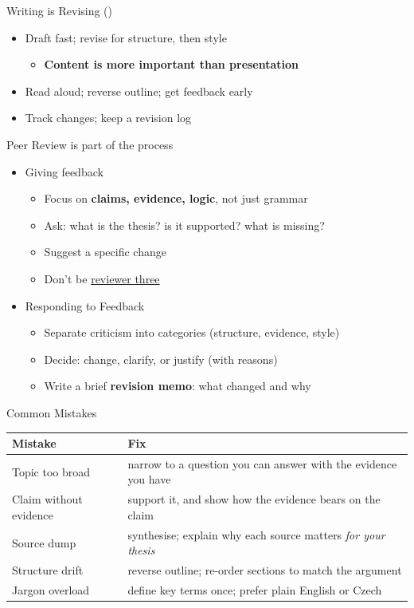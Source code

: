 \documentclass[aspectratio=169]{beamer}
\begin{document}
\begin{frame}{Writing is Revising (\dateWorkshop)}
\begin{itemize}
\item Draft fast; revise for structure, then style
  \begin{itemize}
  \item \textbf{Content is more important than presentation}
  \end{itemize}
  \item Read aloud; reverse outline; get feedback early
  \item Track changes; keep a revision log
\end{itemize}
\end{frame}

\begin{frame}{Peer Review is part of the process}
  \begin{itemize}
  \item Giving feedback
    \begin{itemize}
    \item Focus on \textbf{claims, evidence, logic}, not just grammar
    \item Ask: what is the thesis? is it supported? what is missing?
    \item Suggest a specific change
    \item Don't be \href{https://www.youtube.com/watch?v=-VRBWLpYCPY}{reviewer three}
    \end{itemize}
  \item Responding to Feedback
    \begin{itemize}
    \item Separate criticism into categories (structure, evidence, style)
    \item Decide: change, clarify, or justify (with reasons)
    \item Write a brief \textbf{revision memo}: what changed and why
    \end{itemize}
  \end{itemize}
\end{frame}

\begin{frame}{Common Mistakes}
\small
\begin{center}
\begin{tabular}{@{}ll@{}}
\toprule
\textbf{Mistake} & \textbf{Fix} \\
\midrule
Topic too broad     & narrow to a question you can answer with the evidence you have \\
Claim without evidence & support it, and show how the evidence bears on the claim \\
Source dump         & synthesise; explain why each source matters \emph{for your thesis} \\
Structure drift     & reverse outline; re-order sections to match the argument \\
Jargon overload     & define key terms once; prefer plain English or Czech \\
\bottomrule
\end{tabular}
\end{center}
\end{frame}
\end{document}
